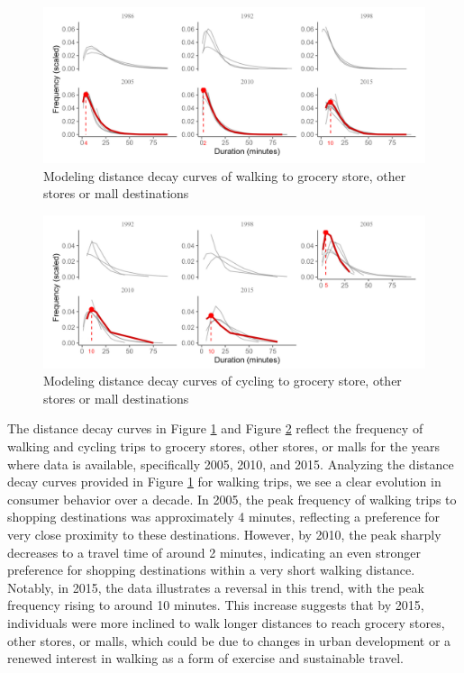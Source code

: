 \documentclass[12pt,twoside]{reedthesis}
\begin{document}
\begin{landscape}
\begin{figure}

{\centering \includegraphics[width=0.9\linewidth]{grocery-wi} 

}

\caption{Modeling distance decay curves of walking to grocery store, other stores or mall destinations}\label{fig:grocery-wi}
\end{figure}
\begin{figure}

{\centering \includegraphics[width=0.9\linewidth]{grocery-ci} 

}

\caption{Modeling distance decay curves of cycling to grocery store, other stores or mall destinations}\label{fig:grocery-ci}
\end{figure}
\end{landscape}
The distance decay curves in Figure \ref{fig:grocery-wi} and Figure \ref{fig:grocery-ci} reflect the frequency of walking and cycling trips to grocery stores, other stores, or malls for the years where data is available, specifically 2005, 2010, and 2015. Analyzing the distance decay curves provided in Figure \ref{fig:grocery-wi} for walking trips, we see a clear evolution in consumer behavior over a decade. In 2005, the peak frequency of walking trips to shopping destinations was approximately 4 minutes, reflecting a preference for very close proximity to these destinations. However, by 2010, the peak sharply decreases to a travel time of around 2 minutes, indicating an even stronger preference for shopping destinations within a very short walking distance. Notably, in 2015, the data illustrates a reversal in this trend, with the peak frequency rising to around 10 minutes. This increase suggests that by 2015, individuals were more inclined to walk longer distances to reach grocery stores, other stores, or malls, which could be due to changes in urban development or a renewed interest in walking as a form of exercise and sustainable travel.
\end{document}
